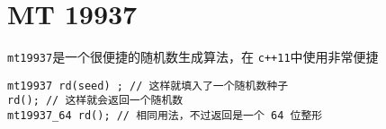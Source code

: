 \section{MT 19937}
\verb|mt19937|是一个很便捷的随机数生成算法，在 \verb|c++11|中使用非常便捷
\begin{lstlisting}
mt19937 rd(seed) ; // 这样就填入了一个随机数种子
rd(); // 这样就会返回一个随机数
mt19937_64 rd(); // 相同用法，不过返回是一个 64 位整形
\end{lstlisting}
